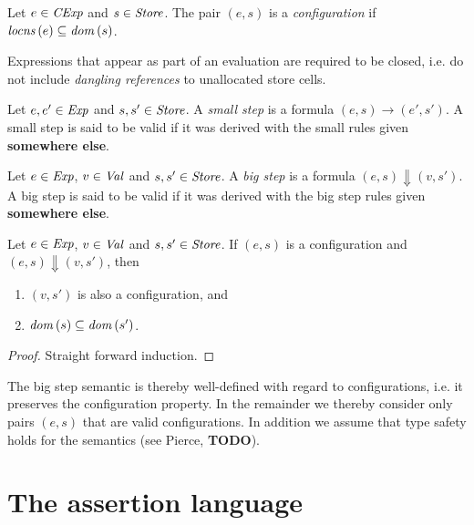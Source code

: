 \documentclass[12pt,a4paper]{report}
\newcommand{\CExp}{\nstyle{CExp}}
\begin{document}
\begin{definition}[Configuration]
  Let $e\in\CExp$ and $s\in\mathit{Store}$. The pair $(e,s)$ is a {\em configuration}
  if $\mathit{locns}\,(e) \subseteq \mathit{dom}\,(s)$.
\end{definition}

Expressions that appear as part of an evaluation are required to be closed, i.e. do not
include {\em dangling references} to unallocated store cells.

\begin{definition}
  Let $e,e'\in\mathit{Exp}$ and $s,s'\in\mathit{Store}$. A {\em small step} is a formula
  $(e,s) \to (e',s')$. A small step is said to be valid if it was derived with
  the small rules given {\bf somewhere else}.
\end{definition}

\begin{definition}
  Let $e\in\mathit{Exp}$, $v\in\mathit{Val}$ and $s,s'\in\mathit{Store}$. A {\em big step} is a formula
  $(e,s) \Downarrow (v,s')$. A big step is said to be valid if it was derived with the
  big step rules given {\bf somewhere else}.
\end{definition}

\begin{corollary}
  Let $e\in\mathit{Exp}$, $v\in\mathit{Val}$ and $s,s'\in\mathit{Store}$. If $(e,s)$ is a configuration
  and $(e,s) \Downarrow (v,s')$, then
  \begin{enumerate}
    \item $(v,s')$ is also a configuration, and
    \item $\mathit{dom}\,(s) \subseteq \mathit{dom}\,(s')$.
  \end{enumerate}
\end{corollary}

\begin{proof}
  Straight forward induction.
\end{proof}

The big step semantic is thereby well-defined with regard to configurations, i.e. it preserves
the configuration property. In the remainder
we thereby consider only pairs $(e,s)$ that are valid configurations. In addition we
assume that type safety holds for the semantics (see Pierce, {\bf TODO}).



\chapter{The assertion language}
\end{document}
